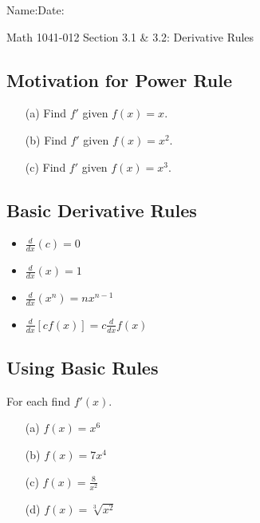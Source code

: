 \documentclass[12pt]{book}
\theoremstyle{definition}
\begin{document}
\begin{flushleft}
Name:\underline{\hspace{13cm}}Date:\underline{\hspace{2cm}}
\end{flushleft}
\begin{center}
{\Large Math 1041-012 \hspace{0.5cm} Section 3.1 \& 3.2: Derivative Rules}
\end{center}
\subsection*{Motivation for Power Rule}
\begin{itemize}
    \item[(a)] Find $f'$ given $f(x)=x$.\vspace{4cm} 
    \item[(b)] Find $f'$ given $f(x)=x^2$.\vspace{4cm}
    \item[(c)] Find $f'$ given $f(x)=x^3$. \vspace{3cm}
\end{itemize}
\begin{tcolorbox}
\subsection*{Basic Derivative Rules}
\begin{itemize}
    \item $\displaystyle\frac{d}{dx}(c)=0$
    \item $\displaystyle\frac{d}{dx}(x)=1$
    \item $\displaystyle\frac{d}{dx}(x^n)=nx^{n-1}$
    \item $\displaystyle\frac{d}{dx}[cf(x)]=c\frac{d}{dx}f(x)$
\end{itemize}
\end{tcolorbox}
\raggedbottom
\clearpage
\subsection*{Using Basic Rules} For each find $f'(x)$.
\begin{itemize}
    \item[(a)]$f(x)=x^6$\vspace{2cm}
    \item[(b)]$f(x)=7x^4$\vspace{2cm}
    \item[(c)]$\displaystyle f(x)=\frac{8}{x^2}$\vspace{2cm}
    \item[(d)]$\displaystyle f(x)=\sqrt[3]{x^2}$\vspace{3cm}
\end{itemize}
\end{document}
